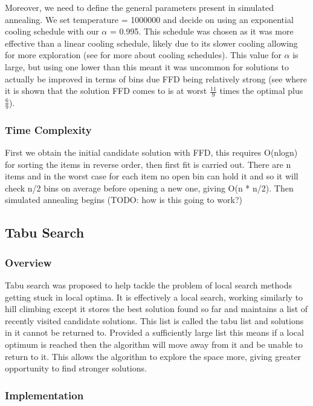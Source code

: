 \documentclass[12pt]{article}
\begin{document}
Moreover, we need to define the general parameters present in simulated annealing. We set temperature = 1000000 and decide on using an exponential cooling schedule with our  $\alpha$ = 0.995. This schedule was chosen as it was more effective than a linear cooling schedule, likely due to its slower cooling allowing for more exploration (see \cite{algafter} for more about cooling schedules). This value for $\alpha$ is large, but using one lower than this meant it was uncommon for solutions to actually be improved in terms of bins due FFD being relatively strong (see \cite{dosa}  where it is shown that the solution FFD comes to is at worst $\tfrac{11}{9}$ times the optimal plus $\tfrac{6}{9}$).

\subsubsection{Time Complexity}

First we obtain the initial candidate solution with FFD, this requires O(nlogn) for sorting the items in reverse order, then first fit is carried out. There are n items and in the worst case for each item no open bin can hold it and so it will check n/2 bins on average before opening a new one, giving O(n * n/2). Then simulated annealing begins (TODO: how is this going to work?)

\subsection{Tabu Search}

\subsubsection{Overview}

Tabu search was proposed to help tackle the problem of local search methods getting stuck in local optima. It is effectively a local search, working similarly to hill climbing except it stores the best solution found so far and maintains a list of recently visited candidate solutions. This list is called the tabu list and solutions in it cannot be returned to. Provided a sufficiently large list this means if a local optimum is reached then the algorithm will move away from it and be unable to return to it. This allows the algorithm to explore the space more, giving greater opportunity to find stronger solutions. 

\subsubsection{Implementation}
\end{document}
